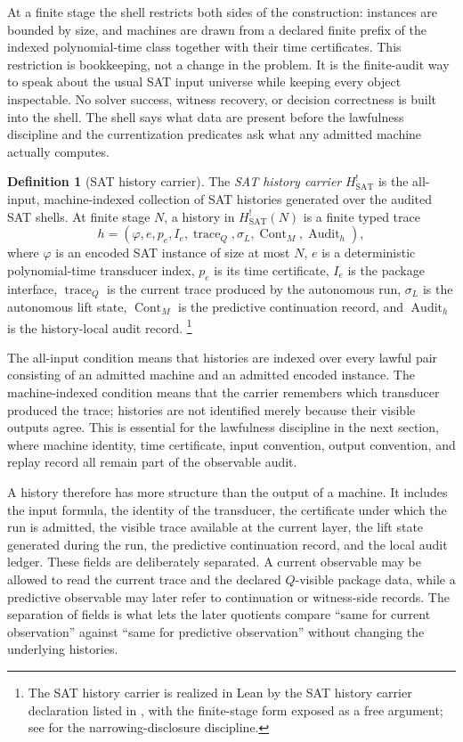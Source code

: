 \documentclass[11pt]{article}
\newcommand{\Hsat}{H^{!}_{\mathrm{SAT}}}
\newcommand{\HsatN}[1]{H^{!}_{\mathrm{SAT}}(#1)}
\theoremstyle{definition}
\newtheorem{definition}[theorem]{Definition}
\begin{document}
At a finite stage the shell restricts both sides of the construction:
instances are bounded by size, and machines are drawn from a declared
finite prefix of the indexed polynomial-time class together with their
time certificates.  This restriction is bookkeeping, not a change in
the problem.  It is the finite-audit way to speak about the usual SAT
input universe while keeping every object inspectable.  No solver
success, witness recovery, or decision correctness is built into the
shell.  The shell says what data are present before the lawfulness
discipline and the currentization predicates ask what any admitted
machine actually computes.

\begin{definition}[SAT history carrier]
\label{def:pvnp:history-carrier}
The \emph{SAT history carrier} \(\Hsat\) is the all-input,
machine-indexed collection of SAT histories generated over the audited
SAT shells.  At finite stage \(N\), a history in \(\HsatN{N}\) is a
finite typed trace
\[
  h=(\varphi,e,p_{e},I_{e},\operatorname{trace}_{Q},
     \sigma_{L},\operatorname{Cont}_{M},\operatorname{Audit}_{h}),
\]
where \(\varphi\) is an encoded SAT instance of size at most \(N\),
\(e\) is a deterministic polynomial-time transducer index, \(p_{e}\)
is its time certificate, \(I_{e}\) is the package interface,
\(\operatorname{trace}_{Q}\) is the current trace produced by the
autonomous run, \(\sigma_{L}\) is the autonomous lift state,
\(\operatorname{Cont}_{M}\) is the predictive continuation record, and
\(\operatorname{Audit}_{h}\) is the history-local audit record.
\footnote{The SAT history carrier is realized in Lean by the SAT
history carrier declaration listed in , with
the finite-stage form exposed as a free argument; see
 for the narrowing-disclosure discipline.}
\end{definition}

The all-input condition means that histories are indexed over every
lawful pair consisting of an admitted machine and an admitted encoded
instance.  The machine-indexed condition means that the carrier
remembers which transducer produced the trace; histories are not
identified merely because their visible outputs agree.  This is
essential for the lawfulness discipline in the next section, where
machine identity, time certificate, input convention, output
convention, and replay record all remain part of the observable
audit.

A history therefore has more structure than the output of a machine.
It includes the input formula, the identity of the transducer, the
certificate under which the run is admitted, the visible trace
available at the current layer, the lift state generated during the
run, the predictive continuation record, and the local audit ledger.
These fields are deliberately separated.  A current observable may be
allowed to read the current trace and the declared \(Q\)-visible
package data, while a predictive observable may later refer to
continuation or witness-side records.  The separation of fields is
what lets the later quotients compare ``same for current observation''
against ``same for predictive observation'' without changing the
underlying histories.
\end{document}
